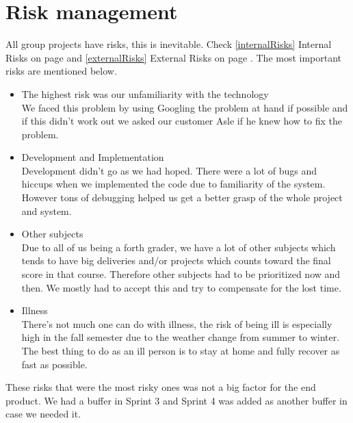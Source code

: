 \section{Risk management}
All group projects have risks, this is inevitable. Check \ref{internalRisks} Internal Risks on page \pageref{internalRisks} and \ref{externalRisks} External Risks on page \pageref{externalRisks}. The most important risks are mentioned below.

\begin{itemize}
\item The highest risk was our unfamiliarity with the technology \\ We faced this problem by using Googling the problem at hand if possible and if this didn't work out we asked our customer Asle if he knew how to fix the problem.
\item Development and Implementation \\ Development didn't go as we had hoped. There were a lot of bugs and hiccups when we implemented the code due to familiarity of the system. However tons of debugging helped us get a better grasp of the whole project and system.
\item Other subjects \\Due to all of us being a forth grader, we have a lot of other subjects which tends to have big deliveries and/or projects which counts toward the final score in that course. Therefore other subjects had to be prioritized now and then. We mostly had to accept this and try to compensate for the lost time.
\item Illness \\ There's not much one can do with illness, the risk of being ill is especially high in the fall semester due to the weather change from summer to winter. The best thing to do as an ill person is to stay at home and fully recover as fast as possible. 
\end{itemize}
These risks that were the most risky ones was not a big factor for the end product. We had a buffer in Sprint 3 and Sprint 4 was added as another buffer in case we needed it.
